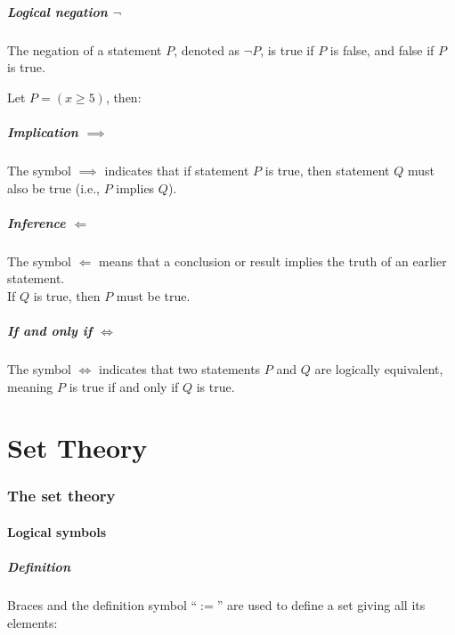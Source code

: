 \documentclass{article}
\begin{document}
\subsubsection{Logical negation $\lnot$}
The negation of a statement $P$, denoted as $\lnot P$, is true if $P$ is false, and false if $P$ is true.

Let $P=(x \geq 5)$, then:

\subsubsection{Implication $\implies$}
The symbol $\implies$ indicates that if statement $P$ is true, then statement $Q$ must also be true (i.e., $P$ implies $Q$).\\


\subsubsection{Inference $\Longleftarrow$}
The symbol $\Leftarrow$ means that a conclusion or result implies the truth of an earlier statement.\\
If $Q$ is true, then $P$ must be true.


\subsubsection{If and only if $\Longleftrightarrow$}
The symbol $\Longleftrightarrow$ indicates that two statements $P$ and $Q$ are logically equivalent, meaning $P$ is true if and only if $Q$ is true.

\part{Set Theory}
\section{The set theory}
\subsection{Logical symbols}
\subsubsection{Definition}
Braces and the definition symbol ``$:=$'' are used to define a set giving all its elements:
\end{document}
